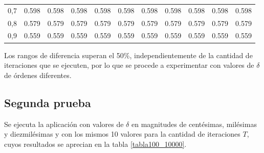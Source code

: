 \begin{table}[h]
\begin{tabular}{crrrrrrrrrr}
0,7                          & 0.598                    & 0.598                    & 0.598                    & 0.598                    & 0.598                    & 0.598                    & 0.598                    & 0.598                    & 0.598                    & 0.598                     \\ 
0,8                          & 0.579                    & 0.579                    & 0.579                    & 0.579                    & 0.579                    & 0.579                    & 0.579                    & 0.579                    & 0.579                    & 0.579                     \\ 
0,9                          & 0.559                    & 0.559                    & 0.559                    & 0.559                    & 0.559                    & 0.559                    & 0.559                    & 0.559                    & 0.559                    & 0.559                     \\ \hline
\end{tabular}
\label{tabla10}
\end{table}
Los rangos de diferencia superan el 50\%, independientemente de la cantidad de iteraciones que se ejecuten, por lo que se procede a experimentar con valores de $\delta$ de órdenes diferentes. 

\subsection{Segunda prueba}

Se ejecuta la aplicación con valores de $\delta$ en magnitudes de centésimas, milésimas y diezmilésimas y con los mismos 10 valores para la cantidad de iteraciones $T$, cuyos resultados se aprecian en la tabla \ref{tabla100_10000}.

